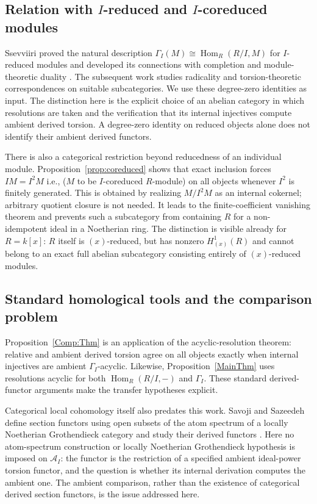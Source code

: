 \documentclass[11pt,reqno]{amsart}
\theoremstyle{definition}
\theoremstyle{remark}
\newcommand{\Hom}{\operatorname{Hom}}
\newcommand{\A}{\mathcal A_I}
\begin{document}
\subsection{Relation with $I$-reduced and $I$-coreduced modules}
Ssevviiri proved the natural description $\Gamma_I(M)\cong\Hom_R(R/I,M)$ for $I$-reduced modules and developed its connections with completion and module-theoretic duality \cite{Ssevviiri2024}. The subsequent work \cite{SsevviiriII} studies radicality and torsion-theoretic correspondences on suitable subcategories. We use these degree-zero identities as input. The distinction here is the explicit choice of an abelian category in which resolutions are taken and the verification that its internal injectives compute ambient derived torsion. A degree-zero identity on reduced objects alone does not identify their ambient derived functors.

There is also a categorical restriction beyond reducedness of an individual module. Proposition~\ref{prop:coreduced} shows that exact inclusion forces $IM=I^2M$ i.e., ($M$ to be $I$-coreduced $R$-module)  on all objects whenever $I^2$ is finitely generated. This is obtained by realizing $M/I^2M$ as an internal cokernel; arbitrary quotient closure is not needed. It leads to the finite-coefficient vanishing theorem and prevents such a subcategory from containing $R$ for a non-idempotent ideal in a Noetherian ring. The distinction is visible already for $R=k[x]$: $R$ itself is $(x)$-reduced, but has nonzero $H_{(x)}^1(R)$ and cannot belong to an exact full abelian subcategory consisting entirely of $(x)$-reduced modules.

\subsection{Standard homological tools and the comparison problem}
Proposition~\ref{Comp:Thm} is an application of the acyclic-resolution theorem: relative and ambient derived torsion agree on all objects exactly when internal injectives are ambient $\Gamma_I$-acyclic. Likewise, Proposition~\ref{MainThm} uses resolutions acyclic for both $\Hom_R(R/I,-)$ and $\Gamma_I$. These standard derived-functor arguments \cite{Weibel1994} make the transfer hypotheses explicit.

Categorical local cohomology itself also predates this work. Savoji and Sazeedeh define section functors using open subsets of the atom spectrum of a locally Noetherian Grothendieck category and study their derived functors \cite{SavojiSazeedeh2019}. Here no atom-spectrum construction or locally Noetherian Grothendieck hypothesis is imposed on $\A$: the functor is the restriction of a specified ambient ideal-power torsion functor, and the question is whether its internal derivation computes the ambient one. The ambient comparison, rather than the existence of categorical derived section functors, is the issue addressed here.
\end{document}
